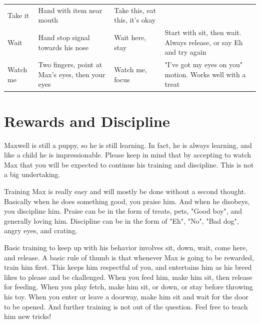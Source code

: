 \documentclass[pdftex,12pt]{article}
\begin{document}
\begin{table}[H]
\begin{adjustwidth}{-4.5cm}{-4.5cm}
\begin{center}
\begin{tabular}{lp{}p{}p{}}
                Take it     & Hand with item near mouth                        & Take this, eat this, it's okay                        &                                                                    \\
                Wait        & Hand stop signal towards his nose                & Wait here, stay                                       & Start with sit, then wait. Always release, or say Eh and try again \\
                Watch me    & Two fingers, point at Max's eyes, then your eyes & Watch me, focus                                       & "I've got my eyes on you" motion. Works well with a treat         
            \end{tabular}
        \end{center}
    \end{adjustwidth}
\end{table}

\newpage
\section{Rewards and Discipline}

Maxwell is still a puppy, so he is still learning. In fact, he is always
learning, and like a child he is impressionable. Please keep in mind that by
accepting to watch Max that you will be expected to continue his training and
discipline.  This is not a big undertaking. 

\bigskip

Training Max is really easy and will mostly be done without a second thought.
Basically when he does something good, you praise him. And when he disobeys, you
discipline him. Praise can be in the form of treats, pets, "Good boy", and
generally loving him. Discipline can be in the form of "Eh", "No", "Bad dog",
angry eyes, and crating. 

\bigskip

Basic training to keep up with his behavior involves sit, down, wait, come
here, and release. A basic rule of thumb is that whenever Max is going to be
rewarded, train him first. This keeps him respectful of you, and entertains him
as his breed likes to please and be challenged. When you feed him, make him sit,
then release for feeding. When you play fetch, make him sit, or down, or stay
before throwing his toy. When you enter or leave a doorway, make him sit and
wait for the door to be opened. And further training is not out of the question.
Feel free to teach him new tricks!
\end{document}
